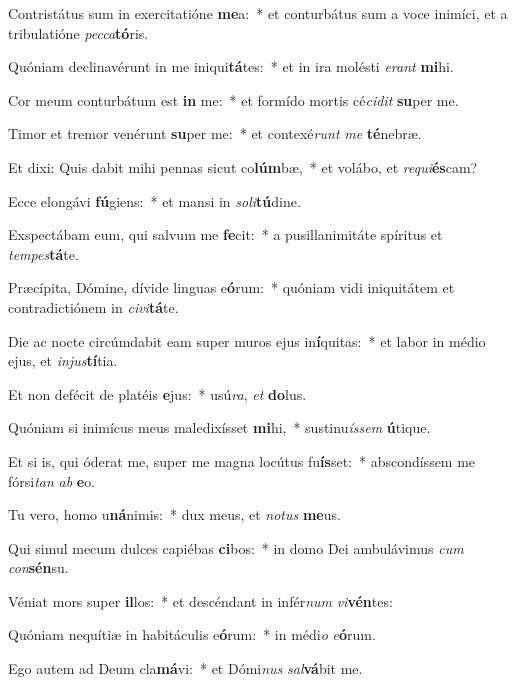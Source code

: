 \item Contristátus sum in exercitatióne \textbf{me}a:~* et conturbátus sum a voce inimíci, et a tribulatióne \textit{pec}\textit{ca}\textbf{tó}ris.
\item Quóniam declinavérunt in me iniqui\textbf{tá}tes:~* et in ira molésti \textit{e}\textit{rant} \textbf{mi}hi.
\item Cor meum conturbátum est \textbf{in} me:~* et formído mortis cé\textit{ci}\textit{dit} \textbf{su}per me.
\item Timor et tremor venérunt \textbf{su}per me:~* et contexé\textit{runt} \textit{me} \textbf{té}nebræ.
\item Et dixi: Quis dabit mihi pennas sicut co\textbf{lúm}bæ,~* et volábo, et \textit{re}\textit{qui}\textbf{és}cam?
\item Ecce elongávi \textbf{fú}giens:~* et mansi in \textit{so}\textit{li}\textbf{tú}dine.
\item Exspectábam eum, qui salvum me \textbf{fe}cit:~* a pusillanimitáte spíritus et \textit{tem}\textit{pes}\textbf{tá}te.
\item Præcípita, Dómine, dívide linguas e\textbf{ó}rum:~* quóniam vidi iniquitátem et contradictiónem in \textit{ci}\textit{vi}\textbf{tá}te.
\item Die ac nocte circúmdabit eam super muros ejus in\textbf{í}quitas:~* et labor in médio ejus, et \textit{in}\textit{jus}\textbf{tí}tia.
\item Et non defécit de platéis \textbf{e}jus:~* usú\textit{ra}, \textit{et} \textbf{do}lus.
\item Quóniam si inimícus meus maledixísset \textbf{mi}hi,~* sustinu\textit{ís}\textit{sem} \textbf{ú}tique.
\item Et si is, qui óderat me, super me magna locútus fu\textbf{ís}set:~* abscondíssem me fórsi\textit{tan} \textit{ab} \textbf{e}o.
\item Tu vero, homo u\textbf{ná}nimis:~* dux meus, et \textit{no}\textit{tus} \textbf{me}us.
\item Qui simul mecum dulces capiébas \textbf{ci}bos:~* in domo Dei ambulávimus \textit{cum} \textit{con}\textbf{sén}su.
\item Véniat mors super \textbf{il}los:~* et descéndant in infér\textit{num} \textit{vi}\textbf{vén}tes:
\item Quóniam nequítiæ in habitáculis e\textbf{ó}rum:~* in médi\textit{o} \textit{e}\textbf{ó}rum.
\item Ego autem ad Deum cla\textbf{má}vi:~* et Dómi\textit{nus} \textit{sal}\textbf{vá}bit me.
